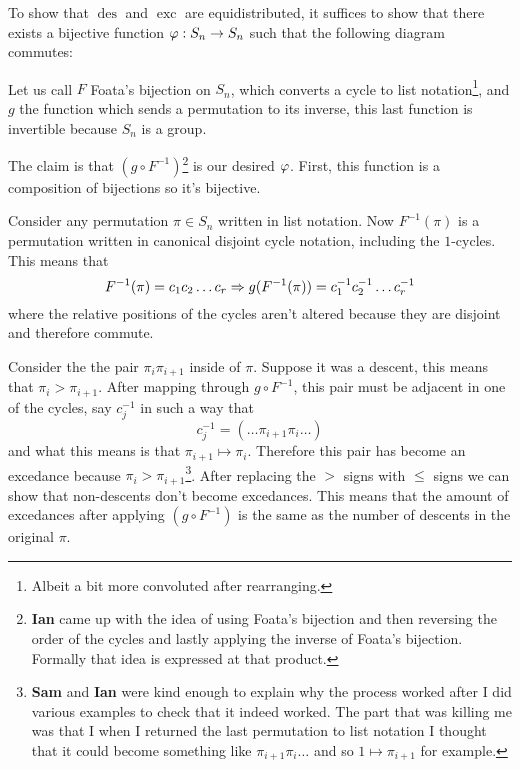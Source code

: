 \documentclass[12pt]{memoir}
\DeclareMathOperator{\des}{des}
\DeclareMathOperator{\exc}{exc}
\begin{document}
\begin{ptcbr}
    To show that $\des$ and $\exc$ are equidistributed, it suffices to show that there exists a bijective function $\varphi:S_n\to S_n$ such that the following diagram commutes:
    \begin{center}
    \end{center}
Let us call $F$ Foata's bijection on $S_n$, which converts a cycle to list notation\footnote{Albeit a bit more convoluted after rearranging.}, and $g$ the function which sends a permutation to its inverse, this last function is invertible because $S_n$ is a group.\par 
The claim is that $(g\circ F^{-1})$\footnote{\textbf{Ian} came up with the idea of using Foata's bijection and then reversing the order of the cycles and lastly applying the inverse of Foata's bijection. Formally that idea is expressed at that product.} is our desired $\varphi$. First, this function is a composition of bijections so it's bijective.\par 
Consider any permutation $\pi\in S_n$ written in list notation. Now $F^{-1}(\pi)$ is a permutation written in canonical disjoint cycle notation, including the $1$-cycles. This means that 
$$F^{-1}(\pi)=c_1c_2\dots c_r\Rightarrow g(F^{-1}(\pi))=c_1^{-1}c_2^{-1}\dots c_r^{-1}$$
where the relative positions of the cycles aren't altered because they are disjoint and therefore commute.\par 
Consider the the pair $\pi_i\pi_{i+1}$ inside of $\pi$. Suppose it was a descent, this means that $\pi_i>\pi_{i+1}$. After mapping through $g\circ F^{-1}$, this pair must be adjacent in one of the cycles, say $c_j^{-1}$ in such a way that 
$$c_j^{-1}=(\dots\pi_{i+1}\pi_i\dots)$$
and what this means is that $\pi_{i+1}\mapsto\pi_i$. Therefore this pair has become an excedance because $\pi_i>\pi_{i+1}$\footnote{\textbf{Sam} and \textbf{Ian} were kind enough to explain why the process worked after I did various examples to check that it indeed worked. The part that was killing me was that I when I returned the last permutation to list notation I thought that it could become something like $\pi_{i+1}\pi_i\dots$ and so $1\mapsto \pi_{i+1}$ for example.}. After replacing the $>$ signs with $\leq$ signs we can show that non-descents don't become excedances. This means that the amount of excedances after applying $(g\circ F^{-1})$ is the same as the number of descents in the original $\pi$.\par 

\end{ptcbr}
\end{document}
